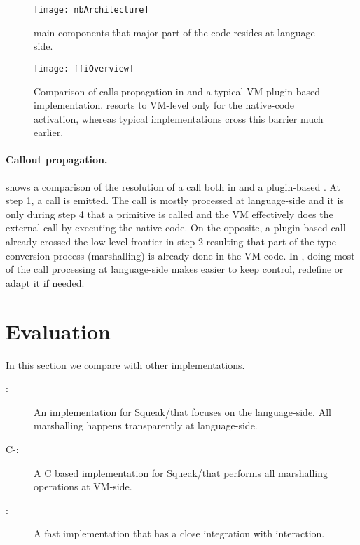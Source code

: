 \begin{figure}[h]
	\centering
	\texttt{[image: nbArchitecture]}
	\caption[\NB Components Layering]{\NB main components that major part of the code resides at language-side.}
\end{figure}

\begin{figure*}[t]
	\centering
	\texttt{[image: ffiOverview]}
	\caption[\FFI Implementation Comparison]{Comparison of \FFI calls propagation in \NBFFI and a typical VM plugin-based implementation. \NB resorts to VM-level only for the native-code activation, whereas typical implementations cross this barrier much earlier.}
\end{figure*}

\paragraph{Callout propagation.}
 shows a comparison of the resolution of a \FFI call both in \NBFFI and a plugin-based \FFI.
At step 1, a \FFI call is emitted.
The \NBFFI call is mostly processed at language-side and it is only during step 4 that a primitive is called and the VM effectively does the external call by executing the native code.
On the opposite, a plugin-based \FFI call already crossed the low-level frontier in step 2 resulting that part of the type conversion process (marshalling) is already done in the VM code.
In \NBFFI, doing most of the \FFI call processing at language-side makes easier to keep control, redefine or adapt it if needed.

\section{\NBFFI Evaluation}

In this section we compare \NB with other \FFI implementations.
\begin{description}
	\item[\Alien \FFI:] An \FFI implementation for Squeak/\PH that focuses on the language-side. All marshalling happens transparently at language-side.
	\item[C-\FFI:] A C based \FFI implementation for Squeak/\PH that performs all marshalling operations at VM-side.
	\item[\LuaJIT:] A fast \Lua implementation that has a close \FFI integration with \JIT interaction.
\end{description}


